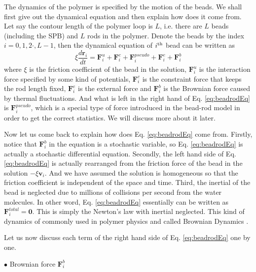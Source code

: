 The dynamics of the polymer is specified by the motion of the beads. We shall first give out the dynamical equation and then explain how does it come from. Let say the contour length of the polymer loop is $L$, i.e. there are $L$ beads (including the SPB) and $L$ rods in the polymer. Denote the beads by the index $i = 0, 1, 2\cdot , L-1$, then the dynamical equation of $i^{\rm {th}}$ bead can be written as
\begin{equation}
    \label{eq:beadrodEq}
    \xi \frac{d \mathbf{r}_i}{d t} = \mathbf{F}_i^{u} + \mathbf{F}_i^{c} + \mathbf{F}_i^{pseudo} + \mathbf{F}_i^{e} + \mathbf{F}_i^{b}
\end{equation}
where $\xi$ is the friction coefficient of the bead in the solution, $\mathbf{F}_i^{u}$ is the interaction force specified by some kind of potentials, $\mathbf{F}_i^{c}$ is the constraint force that keeps the rod length fixed, $\mathbf{F}_i^{e}$ is the external force and $\mathbf{F}_i^{b}$ is the Brownian force caused by thermal fluctuations. And what is left in the right hand of Eq. \eqref{eq:beadrodEq} is $\mathbf{F}_i^{pseudo}$, which is a special type of force introduced in the bead-rod model in order to get the correct statistics. We will discuss more about it later. 

Now let us come back to explain how does Eq. \eqref{eq:beadrodEq} come from.  Firstly, notice that $\mathbf{F}_i^b$ in the equation is a stochastic variable, so Eq. \eqref{eq:beadrodEq} is actually a stochastic differential equation. Secondly, the left hand side of Eq. \eqref{eq:beadrodEq} is actually rearranged from the friction force of the bead in the solution $-\xi\mathbf{v}_i$. And we have assumed the solution is homogeneous so that the friction coefficient is independent of the space and time. Third, the inertial of the bead is neglected due to millions of collisions per second from the water molecules. In other word, Eq. \eqref{eq:beadrodEq} essentially can be written as $\mathbf{F}_i^{total} = \mathbf{0}$. This is simply the Newton's law with inertial neglected. This kind of dynamics of commonly used in polymer physics and called Brownian Dynamics \cite{}. 

Let us now discuss each term of the right hand side of Eq. \eqref{eq:beadrodEq} one by one. 

$\bullet$ Brownian force $\mathbf{F}_i^{b}$

